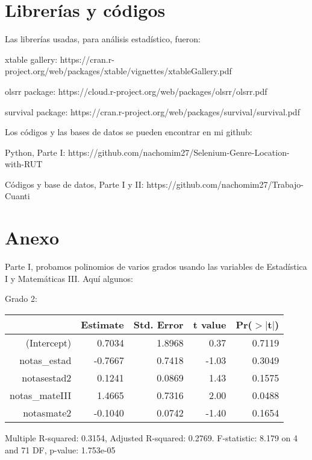 \documentclass[11pt]{article}
\begin{document}
\newpage

\section{Librerías y códigos}

Las librerías usadas, para análisis estadístico, fueron:

xtable gallery: https://cran.r-project.org/web/packages/xtable/vignettes/xtableGallery.pdf

olsrr package: https://cloud.r-project.org/web/packages/olsrr/olsrr.pdf

survival package: https://cran.r-project.org/web/packages/survival/survival.pdf

Los códigos y las bases de datos se pueden encontrar en mi github:

Python, Parte I: https://github.com/nachomim27/Selenium-Genre-Location-with-RUT

Códigos y base de datos, Parte I y II: https://github.com/nachomim27/Trabajo-Cuanti



\newpage

\section*{Anexo}

\appendix

Parte I, probamos polinomios de varios grados usando las variables de Estadística I y Matemáticas III. Aquí algunos:

Grado 2:
\begin{center}
\begin{table}[ht]
\centering
\begin{tabular}{rrrrr}

  \hline
 & Estimate & Std. Error & t value & Pr($>$$|$t$|$) \\ 
  \hline
(Intercept) & 0.7034 & 1.8968 & 0.37 & 0.7119 \\ 
  notas\_estad & -0.7667 & 0.7418 & -1.03 & 0.3049 \\ 
  notasestad2 & 0.1241 & 0.0869 & 1.43 & 0.1575 \\ 
  notas\_mateIII & 1.4665 & 0.7316 & 2.00 & 0.0488 \\ 
  notasmate2 & -0.1040 & 0.0742 & -1.40 & 0.1654 \\ 
   \hline
\end{tabular}
\end{table}

\tiny{Multiple R-squared: 0.3154, Adjusted R-squared: 0.2769.
F-statistic: 8.179 on 4 and 71 DF, p-value: 1.753e-05}
\end{center}
\end{document}
